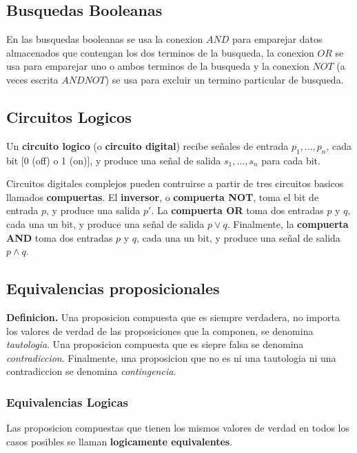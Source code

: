 \documentclass[]{article}
\begin{document}
\subsection*{Busquedas Booleanas}

En las busquedas booleanas se usa la conexion $AND$ para emparejar datos almacenados que contengan los dos terminos de la busqueda, la conexion $OR$ se usa para emparejar uno o ambos terminos de la busqueda y la conexion $NOT$ (a veces escrita $AND NOT$) se usa para excluir un termino particular de busqueda.

\subsection*{Circuitos Logicos}

Un \textbf{circuito logico} (o \textbf{circuito digital}) recibe señales de entrada $p_{1}, ..., p_{n}$, cada bit [0 (off) o 1 (on)], y produce una señal de salida $s_{1}, ..., s_{n}$ para cada bit.

Circuitos digitales complejos pueden contruirse a partir de tres circuitos basicos llamados \textbf{compuertas}. El \textbf{inversor}, o \textbf{compuerta NOT}, toma el bit de entrada $p$, y produce una salida $p'$. La \textbf{compuerta OR} toma dos entradas $p$ y $q$, cada una un bit, y produce una señal de salida $p \vee q$. Finalmente, la \textbf{compuerta AND} toma dos entradas $p$ y $q$, cada una un bit, y produce una señal de salida $p \wedge q$.

\subsection{Equivalencias proposicionales}

\textbf{Definicion.} Una proposicion compuesta que es siempre verdadera, no importa los valores de verdad de las proposiciones que la componen, se denomina \textit{tautologia}. Una proposicion compuesta que es siepre falsa se denomina \textit{contradiccion}. Finalmente, una proposicion que no es ni una tautologia ni una contradiccion se denomina \textit{contingencia}.

\subsubsection*{Equivalencias Logicas}

Las proposicion compuestas que tienen los mismos valores de verdad en todos los casos posibles se llaman \textbf{logicamente equivalentes}.\\
\end{document}
